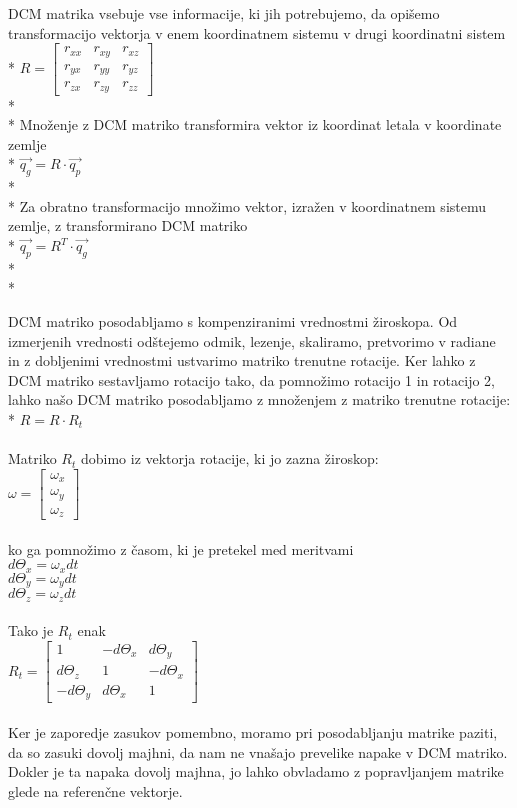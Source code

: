 \documentclass[]{article}
\begin{document}
DCM matrika vsebuje vse informacije, ki jih potrebujemo, da opišemo transformacijo vektorja v enem koordinatnem sistemu v drugi koordinatni sistem\\*
$ R = \left[ \begin{array}{ccc}
r_{xx} & r_{xy} & r_{xz} \\ 
r_{yx} & r_{yy} & r_{yz} \\ 
r_{zx} & r_{zy} & r_{zz}
\end{array} \right]  $\\*\\*
Množenje z DCM matriko transformira vektor iz koordinat letala v koordinate zemlje\\*
$ \vec {q_{g}} = R \cdot \vec {q_{p}} $ \\*\\*
Za obratno transformacijo množimo vektor, izražen v koordinatnem sistemu zemlje, z transformirano DCM matriko\\*
$ \vec {q_{p}} = R^{T} \cdot \vec {q_{g}} $\\*\\*

DCM matriko posodabljamo s kompenziranimi vrednostmi žiroskopa. Od izmerjenih vrednosti odštejemo odmik, lezenje, skaliramo, pretvorimo v radiane in z dobljenimi vrednostmi ustvarimo matriko trenutne rotacije. Ker lahko z DCM matriko sestavljamo rotacijo tako, da pomnožimo rotacijo 1 in rotacijo 2, lahko našo DCM matriko posodabljamo z množenjem z matriko trenutne rotacije:\\*
$ R = R \cdot R_{t} $\\\\
Matriko $ R_{t} $ dobimo iz vektorja rotacije, ki jo zazna žiroskop:\\
$ \omega = \left[ \begin{array}{c}
 \omega_{x}\\ 
 \omega_{y}\\ 
\omega_{z}
\end{array}\right]   $\\\\
ko ga pomnožimo z časom, ki je pretekel med meritvami\\
$ d\Theta_{x} = \omega_{x}dt $\\
$ d\Theta_{y} = \omega_{y}dt $\\
$ d\Theta_{z} = \omega_{z}dt $\\\\
Tako je $ R_{t} $ enak\\
$ R_{t}= \left[ \begin{array}{ccc}
1 & -d\Theta_{x} & d\Theta_{y} \\ 
d\Theta_{z} & 1 & -d\Theta_{x} \\ 
-d\Theta_{y} & d\Theta_{x}& 1
\end{array} \right]  $\\\\
Ker je zaporedje zasukov pomembno, moramo pri posodabljanju matrike paziti, da so zasuki dovolj majhni, da nam ne vnašajo prevelike napake v DCM matriko. Dokler je ta napaka dovolj majhna, jo lahko obvladamo z popravljanjem matrike glede na referenčne vektorje.
\end{document}
